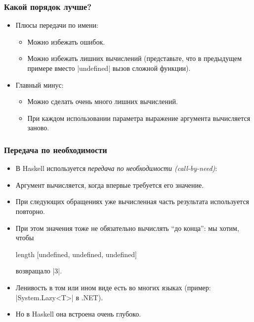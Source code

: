 \documentclass[11pt]{beamer}
\begin{document}
\begin{frame}[fragile]
  \frametitle{Какой порядок лучше?}
  \begin{itemize}
    \item Плюсы передачи по имени:
          \pause
          \begin{itemize}
            \item Можно избежать ошибок.
            \item Можно избежать лишних вычислений
                  \pause (представьте, что в предыдущем примере вместо \haskinline|undefined| вызов сложной функции).
          \end{itemize}
          \pause
    \item Главный минус:
          \pause
          \begin{itemize}
            \item Можно сделать очень много лишних вычислений.
                  \pause
            \item При каждом использовании параметра выражение аргумента вычисляется заново.
          \end{itemize}
  \end{itemize}
\end{frame}

\begin{frame}[fragile]
  \frametitle{Передача по необходимости}
  \begin{itemize}
    \item В Haskell используется \emph{передача по необходимости (call-by-need)}:
    \item Аргумент вычисляется, когда впервые требуется его значение.
          \pause
    \item При следующих обращениях уже вычисленная часть результата используется повторно.
          \pause
    \item При этом значения тоже не обязательно вычислять \enquote{до конца}: мы хотим, чтобы
          \begin{haskell}
            length [undefined, undefined, undefined]
          \end{haskell}
          возвращало \haskinline|3|.
          \pause
    \item Ленивость в том или ином виде есть во многих языках (пример: \haskinline|System.Lazy<T>| в .NET).
    \item Но в Haskell она встроена очень глубоко.
  \end{itemize}
\end{frame}
\end{document}
